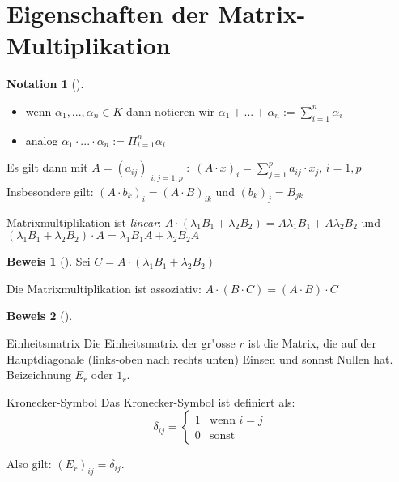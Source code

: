 \documentclass[oneside,fontsize=11pt,paper=a4,BCOR=0mm,DIV=12,automark,headsepline]{scrbook}
\theoremstyle{remark}
\theoremstyle{definition}
\newtheorem*{notation}{Notation}
\theoremstyle{definition}
\newtheorem*{prof}{Beweis}
\theoremstyle{remark}
\begin{document}
\section{Eigenschaften der Matrix-Multiplikation}
\label{sec:org8eaaee0}
\begin{notation}[]
  \begin{itemize}
  \item wenn \(\alpha_1,...,\alpha_n\in K\) dann notieren wir \(\alpha_1+...+\alpha_n :=
    \sum_{i=1}^{n}{\alpha_i}\)
  \item analog \(\alpha_1\cdot ...\cdot\alpha_n := \Pi_{i=1}^{n}{\alpha_i}\)
  \end{itemize}
\end{notation}

\begin{relation}
  Es gilt dann mit \(A=(a_{ij})_{\substack{i,j=1,p}}:\; (A\cdot
  x)_i=\sum_{j=1}^{p}{a_{ij}\cdot x_j,\, i=1,p}\) \\

  Insbesondere gilt: \((A\cdot b_k)_i = (A\cdot B)_{ik}\) und \((b_k)_j=B_{jk}\)
\end{relation}

\begin{relation}
  Matrixmultiplikation ist \emph{linear}: \(A\cdot (\lambda_1 B_1 + \lambda_2 B_2)= A\lambda_1 B_1 + A\lambda_2 B_2\) und \((\lambda_1 B_1 + \lambda_2 B_2) \cdot A= \lambda_1 B_1 A + \lambda_2 B_2 A\)
\end{relation}

\begin{prof}[]
  Sei \(C=A\cdot (\lambda_1 B_1 + \lambda_2 B_2)\)
\end{prof}

\begin{relation}
  Die Matrixmultiplikation ist assoziativ: \(A\cdot (B\cdot C)=(A\cdot B)\cdot C\)
\end{relation}

\begin{prof}[]

\end{prof}

\begin{definition}{Einheitsmatrix}{}
  Die Einheitsmatrix der gr"osse \(r\) ist die Matrix, die auf der Hauptdiagonale
  (links-oben nach rechts unten) Einsen und sonnst Nullen hat. Beizeichnung \(E_r\)
  oder \(1_r\).
\end{definition}

\begin{definition}{Kronecker-Symbol}{}
  Das Kronecker-Symbol ist definiert als: \[\delta_{ij}=
    \begin{cases}
      1 & \text{wenn } i=j\\
      0 & \text{sonst}
    \end{cases}
\]

  Also gilt: \((E_r)_{ij}=\delta_{ij}\).
\end{definition}
\end{document}
